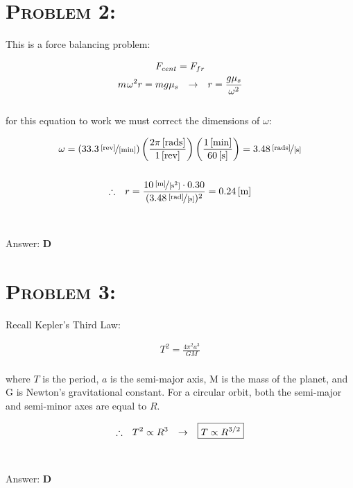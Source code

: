 \documentclass{article}
\begin{document}

\section{\textsc{Problem 2:}} This is a force balancing problem:

\begin{gather}
F_{cent} = F_{fr}\nonumber\\
m \hspace{.01in} \omega^{2} r = m g \mu_{s} \hspace{.1in} \rightarrow \hspace{.1in} r =\frac{g \mu_{s}}{\omega^2} \nonumber
\end{gather}
\\
for this equation to work we must correct the dimensions of $\omega$:

\begin{gather}
\omega= (\unitfrac[33.3]{[rev]}{[min]}) \left(   \frac{\unit[2 \pi]{[rads]}}{\unit[1]{[rev]}} \right)   \left(\frac{\unit[1]{[min]}}{\unit[60]{[s]}} \right) = \unitfrac[3.48]{[rads]}{[s]}\nonumber\\
\nonumber\\
\therefore \hspace{.1in}r = \frac{\unitfrac[10]{[m]}{[s^{2}]} \cdot 0.30}{(\unitfrac[3.48]{[rad]}{[s]})^{2}} = \unit[0.24]{[m]}\nonumber
\end{gather}
\\\\
Answer: \textbf{\textcolor{ProcessBlue}D}\\


\section{\textsc{Problem 3:}} Recall Kepler's Third Law:

\begin{gather}
T^{2} = \frac{4 \pi^{2} a^{3}}{G M}
\end{gather}
\\
where $T$ is the period, $a$ is the semi-major axis, M is the mass of the planet, and G is Newton's gravitational constant. For a circular orbit, both the semi-major and semi-minor axes are equal to $R$.

\begin{gather}
\therefore \hspace{.1in} T^{2} \propto R^{3} \hspace{.1in} \rightarrow \hspace{.1in} \boxed{T \propto R^{3/2}}\nonumber
\end{gather}
\\\\
Answer: \textbf{\textcolor{ProcessBlue}D}\\
\end{document}

